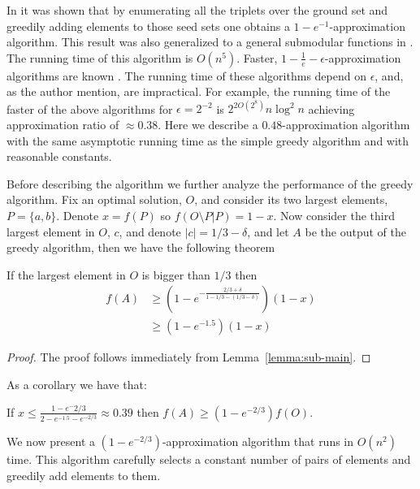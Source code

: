 In \cite{khuller1999budgeted} it was shown that by enumerating all the triplets over the 
ground set and greedily adding elements to those seed sets one obtains a 
$1-e^{-1}$-approximation algorithm.
This result was also generalized to a general submodular functions in \cite{sviridenko2004note}.
The running time of this algorithm is $O(n^5)$.
Faster, $1 - \frac{1}{e} - \epsilon$-approximation algorithms
are known \cite{Alina2017, badanidiyuru2014fast}. 
The running time of these algorithms depend on $\epsilon$, 
and, as the author mention, are impractical. 
For example, the running time of the faster of the above algorithms for $\epsilon = 2^{-2}$ is
$2^{2O(2^{8})}n\log^2n$ achieving approximation ratio of $\approx 0.38$.
Here we describe a $0.48$-approximation algorithm with the same 
asymptotic running time as the simple greedy algorithm and with reasonable constants.


Before describing the algorithm we further analyze the performance of the greedy algorithm.
Fix an optimal solution, $O$, and consider its two largest elements, $P = \{a, b\}$.
Denote $x = f(P)$ so $f(O \setminus P | P) = 1 - x$.
Now consider the third largest element in $O$, $c$, and denote $|c| = 1/3 - \delta$,
and let $A$ be the output of the greedy algorithm, then we have the following theorem

\begin{theorem}
If the largest element in $O$ is bigger than $1/3$ then 
\begin{align*}
f(A) 	& \geq (1-e^{-\frac{2/3 + \delta}{1 - 1/3 - (1/3 - \delta)}})(1 - x)
\\		& \geq (1 - e^{-1.5})(1 - x) 
\end{align*}
\end{theorem} 

\begin{proof}
The proof follows immediately from Lemma~\ref{lemma:sub-main}.
\end{proof}

As a corollary we have that:

\begin{corollary}
If $x \leq \frac{1 - e^-{2/3}}{2 - e^{-1.5} - e^{-2/3}} \approx 0.39$ 
then $f(A) \geq (1 - e^{-2/3})f(O)$.
\end{corollary}

We now present a $(1-e^{-2/3})$-approximation algorithm that runs in $O(n^2)$ time.
This algorithm carefully selects a constant number of pairs of elements and greedily 
add elements to them.

